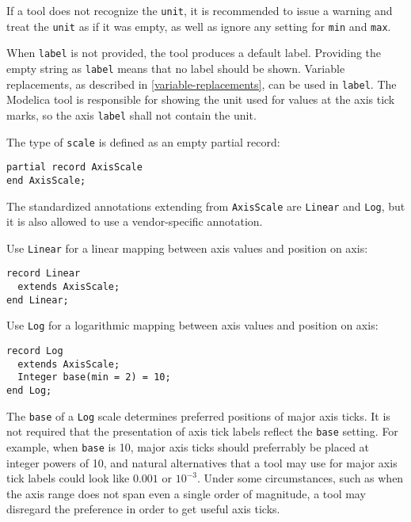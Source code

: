If a tool does not recognize the \lstinline!unit!, it is recommended to issue a warning and treat the \lstinline!unit! as if it was empty, as well as ignore any setting for \lstinline!min! and \lstinline!max!.

When \lstinline!label! is not provided, the tool produces a default label.
Providing the empty string as \lstinline!label! means that no label should be shown.
Variable replacements, as described in \cref{variable-replacements}, can be used in \lstinline!label!.
The Modelica tool is responsible for showing the unit used for values at the axis tick marks, so the axis \lstinline!label! shall not contain the unit.

The type of \lstinline!scale! is defined as an empty partial record:
\begin{lstlisting}[language=modelica]
partial record AxisScale
end AxisScale;
\end{lstlisting}%

The standardized annotations extending from \lstinline!AxisScale! are \lstinline!Linear! and  \lstinline!Log!, but it is also allowed to use a vendor-specific annotation.

Use \lstinline!Linear! for a linear mapping between axis values and position on axis:
\begin{lstlisting}[language=modelica]
record Linear
  extends AxisScale;
end Linear;
\end{lstlisting}%

Use \lstinline!Log! for a logarithmic mapping between axis values and position on axis:
\begin{lstlisting}[language=modelica]
record Log
  extends AxisScale;
  Integer base(min = 2) = 10;
end Log;
\end{lstlisting}%

The \lstinline!base! of a \lstinline!Log! scale determines preferred positions of major axis ticks.
It is not required that the presentation of axis tick labels reflect the \lstinline!base! setting.
For example, when \lstinline!base! is 10, major axis ticks should preferrably be placed at integer powers of 10, and natural alternatives that a tool may use for major axis tick labels could look like $0.001$ or $10^{-3}$.
Under some circumstances, such as when the axis range does not span even a single order of magnitude, a tool may disregard the preference in order to get useful axis ticks.

